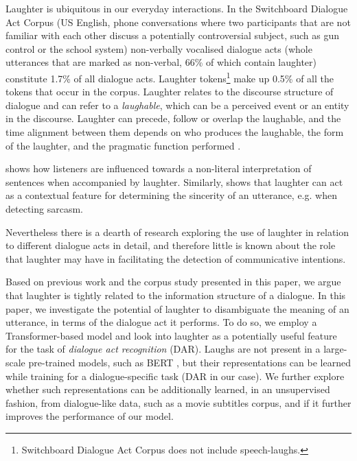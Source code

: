 \documentclass[11pt,a4paper]{article}
\begin{document}
Laughter is ubiquitous in our everyday interactions.  In the
Switchboard Dialogue Act Corpus \citep[SWDA,][]{jurafsky1997switchboard} (US
English, phone conversations where two participants that
are not familiar with each other discuss a potentially controversial
subject, such as gun control or the school system) non-verbally vocalised
dialogue acts (whole utterances that are marked as non-verbal, 66\% of
which contain laughter) constitute 1.7\% of all dialogue acts.
Laughter tokens\footnote{Switchboard Dialogue Act Corpus does not include speech-laughs.} make up 0.5\% of all the tokens that occur in the
corpus.
%
Laughter relates to the discourse structure of dialogue
and can refer to a \emph{laughable}, which can be a perceived event or an
entity in the discourse.
Laughter can precede, follow or overlap the laughable, and the time alignment between them depends on who produces
the laughable, the form of the laughter, and the pragmatic function performed \citep{tian2016we}. 

\citet{bryant2016laughter} shows how listeners are influenced towards a non-literal interpretation of sentences when accompanied by laughter. Similarly, \citet{tepperman2006yeah} shows that laughter can act as a contextual feature for determining the sincerity of an utterance, e.g. when detecting sarcasm. %

Nevertheless there is a dearth of research exploring the use of
laughter in relation to different dialogue acts in detail, and
therefore little is known about the role that laughter may have in
facilitating the detection of communicative intentions.

Based on previous work and the corpus study presented in this paper, we argue that laughter is tightly related to the information structure of a dialogue. In this paper, we investigate the potential of laughter
to disambiguate the meaning of an utterance, in terms of 
the dialogue act it performs. To do so, we employ a
Transformer-based model and look into laughter as a potentially useful
feature for the task of \emph{dialogue act recognition} (DAR). Laughs are not
present in a large-scale pre-trained models, such as BERT \citep{Devlin2019a}, but their
representations can be learned while training for a dialogue-specific
task (DAR in our case). We further explore whether such representations
can be additionally learned, in an unsupervised fashion, from
dialogue-like data, such as a movie subtitles corpus, and if it
further improves the performance of our model. 
\end{document}
